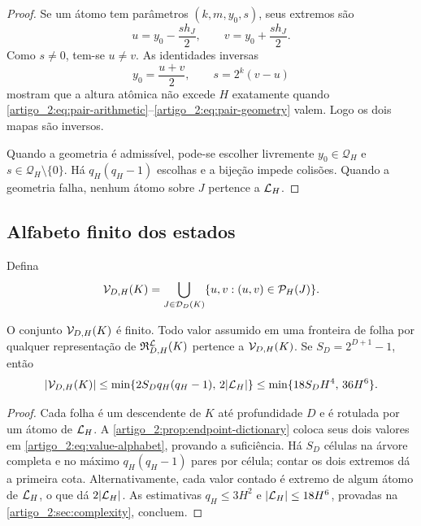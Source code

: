 \begin{proof}
Se um átomo tem parâmetros $(k,m,y_0,s)$, seus extremos são
\[
 u=y_0-\frac{s h_J}{2},\qquad
 v=y_0+\frac{s h_J}{2}.
\]
Como $s\ne0$, tem-se $u\ne v$. As identidades inversas
\[
 y_0=\frac{u+v}{2},\qquad s=2^k(v-u)
\]
mostram que a altura atômica não excede $H$ exatamente quando
\eqref{artigo_2:eq:pair-arithmetic}--\eqref{artigo_2:eq:pair-geometry} valem. Logo os dois
mapas são inversos.

Quando a geometria é admissível, pode-se escolher livremente
$y_0\in\mathcal Q_H$ e $s\in\mathcal Q_H\setminus\{0\}$. Há
$q_H(q_H-1)$ escolhas e a bijeção impede colisões. Quando a geometria falha,
nenhum átomo sobre $J$ pertence a $\mathcal{L}_H$.
\end{proof}

\subsection{Alfabeto finito dos estados}

\begin{definition}\label{map:artigo_2:4.3}
\label{artigo_2:def:value-alphabet}
Defina
\begin{equation}
 \mathcal{V}_{D,H}(K)
 =\bigcup_{J\in\mathcal D_D(K)}
 \{u,v:(u,v)\in\mathcal{P}_H(J)\}.
 \label{artigo_2:eq:value-alphabet}
\end{equation}
\end{definition}

\begin{lemma}\label{map:artigo_2:4.4}
\label{artigo_2:lem:value-alphabet}
O conjunto $\mathcal{V}_{D,H}(K)$ é finito. Todo valor assumido em uma fronteira
de folha por qualquer representação de
$\mathfrak{R}_{D,H}^{\mathcal{L}}(K)$ pertence a
$\mathcal{V}_{D,H}(K)$. Se $S_D=2^{D+1}-1$, então
\begin{equation}
 |\mathcal{V}_{D,H}(K)|
 \le \min\{2S_Dq_H(q_H-1),\,2|\mathcal{L}_H|\}
 \le \min\{18S_DH^4,\,36H^6\}.
 \label{artigo_2:eq:value-alphabet-bound}
\end{equation}
\end{lemma}

\begin{proof}
Cada folha é um descendente de $K$ até profundidade $D$ e é rotulada por um
átomo de $\mathcal{L}_H$. A \cref{artigo_2:prop:endpoint-dictionary} coloca seus dois
valores em \eqref{artigo_2:eq:value-alphabet}, provando a suficiência. Há $S_D$ células
na árvore completa e no máximo $q_H(q_H-1)$ pares por célula; contar os dois
extremos dá a primeira cota. Alternativamente, cada valor contado é extremo
de algum átomo de $\mathcal{L}_H$, o que dá $2|\mathcal{L}_H|$. As estimativas
$q_H\le3H^2$ e $|\mathcal{L}_H|\le18H^6$, provadas na \cref{artigo_2:sec:complexity},
concluem.
\end{proof}

